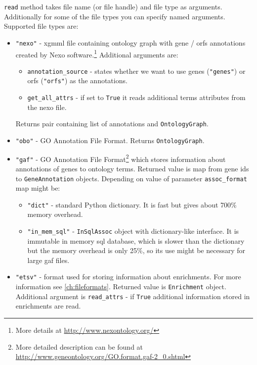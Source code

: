 \verb|read| method takes file name (or file handle) and file type as arguments.
Additionally for some of the file types you can specify named arguments.
Supported file types are:
\begin{itemize}
\item \verb|"nexo"| - xgmml file containing ontology graph with gene / orfs
annotations created by Nexo software.\footnote{More details at \url{http://www.nexontology.org/}}
Additional arguments are:
\begin{itemize}
\item \verb|annotation_source| - states whether we want to use genes (\verb|"genes"|)
or orfs (\verb|"orfs"|) as the annotations.
\item \verb|get_all_attrs| - if set to \verb|True| it reads additional terms attributes
from the nexo file.
\end{itemize}
Returns pair containing list of annotations and \verb|OntologyGraph|. 
\item \verb|"obo"| - GO Annotation File Format. Returns
\verb|OntologyGraph|.
\item \verb|"gaf"| - GO Annotation File Format\footnote{More detailed description
can be found at \url{http://www.geneontology.org/GO.format.gaf-2_0.shtml}}
which stores information about annotations of genes to ontology terms.
Returned value is map from gene ids to \verb|GeneAnnotation| objects.
Depending on value of parameter \verb|assoc_format| map might be:
\begin{itemize}
\item \verb|"dict"| - standard Python dictionary. It is fast but
gives about 700\% memory overhead.
\item \verb|"in_mem_sql"| - \verb|InSqlAssoc| object with
dictionary-like interface. It is immutable in memory sql database, which
is slower than the dictionary but the memory overhead is only 25\%, so its use might be necessary for large gaf files.
\end{itemize}
\item \verb|"etsv"| - format used for storing information about
enrichments. For more information see \ref{ch:fileformats}. Returned
value is \verb|Enrichment| object. Additional argument is
\verb|read_attrs| - if \verb|True| additional information stored
in enrichments are read.
\end{itemize}

